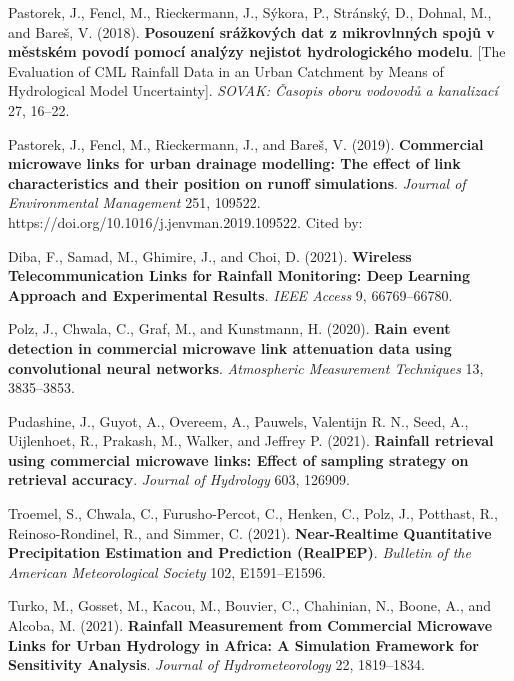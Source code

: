 \documentclass{ctuthesis}\usepackage[]{graphicx}\usepackage[]{color}
\begin{document}
\begin{description}

\item Pastorek, J., Fencl, M., Rieckermann, J., Sýkora, P., Stránský, D., Dohnal, M., and Bareš, V. (2018). \textbf{Posouzení srážkových dat z mikrovlnných spojů v městském povodí pomocí analýzy nejistot hydrologického modelu}. [The Evaluation of CML Rainfall Data in an Urban Catchment by Means of Hydrological Model Uncertainty]. \emph{SOVAK: Časopis oboru vodovodů a kanalizací} 27, 16--22.

\item  Pastorek, J., Fencl, M., Rieckermann, J., and Bareš, V. (2019).  \textbf{Commercial microwave links for urban drainage modelling: The effect of link characteristics and their position on runoff simulations}. \emph{Journal of Environmental Management} 251, 109522. https://doi.org/10.1016/j.jenvman.2019.109522.
Cited by:
        \begin{description}
                \item Diba, F., Samad, M., Ghimire, J., and Choi, D. (2021). \textbf{Wireless Telecommunication Links for Rainfall Monitoring: Deep Learning Approach and Experimental Results}. \emph{IEEE Access} 9, 66769--66780.
                \item Polz, J., Chwala, C., Graf, M., and Kunstmann, H. (2020). \textbf{Rain event detection in commercial microwave link attenuation data using convolutional neural networks}. \emph{Atmospheric Measurement Techniques} 13, 3835--3853.
                \item Pudashine, J., Guyot, A., Overeem, A., Pauwels, Valentijn R. N., Seed, A., Uijlenhoet, R., Prakash, M., Walker, and Jeffrey P. (2021). \textbf{Rainfall retrieval using commercial microwave links: Effect of sampling strategy on retrieval accuracy}. \emph{Journal of Hydrology} 603, 126909.
                \item Troemel, S., Chwala, C., Furusho-Percot, C., Henken, C., Polz, J., Potthast, R., Reinoso-Rondinel, R., and Simmer, C. (2021). \textbf{Near-Realtime Quantitative Precipitation Estimation and Prediction (RealPEP)}. \emph{Bulletin of the American Meteorological Society} 102, E1591--E1596.
                \item Turko, M., Gosset, M., Kacou, M., Bouvier, C., Chahinian, N., Boone, A., and Alcoba, M. (2021). \textbf{Rainfall Measurement from Commercial Microwave Links for Urban Hydrology in Africa: A Simulation Framework for Sensitivity Analysis}. \emph{Journal of Hydrometeorology} 22, 1819--1834. 

\end{description}
\end{description}
\end{document}
